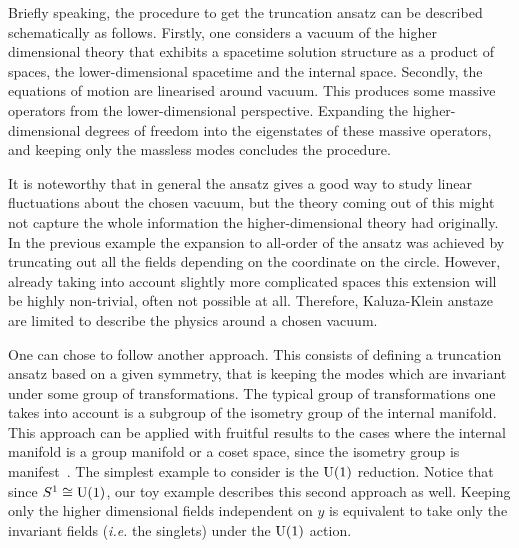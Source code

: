 \documentclass[debug]{phd}
\begin{document}
				Briefly speaking, the procedure to get the truncation ansatz can be described schematically as follows.
				Firstly, one considers a vacuum of the higher dimensional theory that exhibits a spacetime solution structure as a product of spaces, the lower-dimensional spacetime and the internal space.
				Secondly, the equations of motion are linearised around vacuum.
				This produces some massive operators from the lower-dimensional perspective.
				Expanding the higher-dimensional degrees of freedom into the eigenstates of these massive operators, and keeping only the massless modes concludes the procedure.
			
				It is noteworthy that in general the ansatz gives a good way to study linear fluctuations about the chosen vacuum, but the theory coming out of this might not capture the whole information the higher-dimensional theory had originally.
				In the previous example the expansion to all-order of the ansatz was achieved by truncating out all the fields depending on the coordinate on the circle.
				However, already taking into account slightly more complicated spaces this extension will be highly non-trivial, often not possible at all.
				Therefore, Kaluza-Klein anstaze are limited to describe the physics around a chosen vacuum.
			
				One can chose to follow another approach.
				This consists of defining a truncation ansatz based on a given symmetry, that is keeping the modes which are invariant under some group of transformations.
				The typical group of transformations one takes into account is a subgroup of the isometry group of the internal manifold.
				This approach can be applied with fruitful results to the cases where the internal manifold is a group manifold or a coset space, since the isometry group is manifest~\cite{Cvetic:2003jy, schschw}.
				The simplest example to consider is the $\mathrm{U}(1)$ reduction.
				Notice that since $S^1 \cong \mathrm{U}(1)$, our toy example describes this second approach as well.
				Keeping only the higher dimensional fields independent on $y$ is equivalent to take only the invariant fields (\emph{i.e.} the singlets) under the $\mathrm{U}(1)$ action.
			
\end{document}
